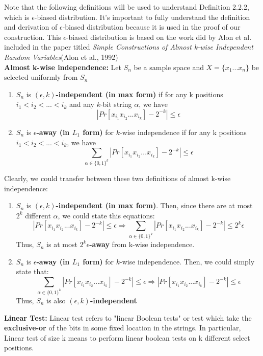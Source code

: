\documentclass[a4paper, english]{paper}
\begin{document}
Note that the following definitions will be used to understand Definition 2.2.2, which is $\epsilon$-biased distribution. It's important to fully understand the definition and derivation of $\epsilon$-biased distribution because it is used in the proof of our construction. This $\epsilon$-biased distribution is based on the work did by Alon et al. included in the paper titled \textit{Simple Constructions of Almost k-wise Independent Random Variables}(Alon et al., 1992)\\

	\noindent\textbf{Almost k-wise independence:}
	Let $S_n$ be a sample space and $X=\{x_1...x_n\}$ be selected uniformly from $S_n$
	\begin{enumerate}
	\item $S_n$ is  \textbf{$(\epsilon,k)$-independent (in max form)} if for any k positions $i_1<i_2<...<i_k$ and any $k$-bit string $\alpha$, we have
		$$|Pr[x_{i_1}x_{i_2}...x_{i_k}]-2^{-k}|\le \epsilon$$
	\item $S_n$ is \textbf{$\epsilon$-away (in $L_1$ form)} for $k$-wise independence if for any k positions $i_1<i_2<...<i_k$, we have
		$$\sum_{\alpha\in\{0,1\}^k}|Pr[x_{i_1}x_{i_2}...x_{i_k}]-2^{-k}| \le \epsilon$$
	\end{enumerate}\par
Clearly, we could transfer between these two definitions of almost k-wise independence:
	\begin{enumerate}
	\item $S_n$ is  \textbf{$(\epsilon,k)$-independent (in max form)}. Then, since there are at most $2^k$ different $\alpha$, we could state this equations:
$$|Pr[x_{i_1}x_{i_2}...x_{i_k}]-2^{-k}|\le \epsilon \Rightarrow \sum_{\alpha\in\{0,1\}^k}|Pr[x_{i_1}x_{i_2}...x_{i_k}]-2^{-k}| \le 2^k\epsilon$$
	Thus, $S_n$ is at most \textbf{$2^k\epsilon$-away} from k-wise independence.
	\item $S_n$ is \textbf{$\epsilon$-away (in $L_1$ form)} for $k$-wise independence. Then, we could simply state that:
$$\sum_{\alpha\in\{0,1\}^k}|Pr[x_{i_1}x_{i_2}...x_{i_k}]-2^{-k}| \le \epsilon \Rightarrow |Pr[x_{i_1}x_{i_2}...x_{i_k}]-2^{-k}|\le \epsilon $$
	Thus, $S_n$ is also \textbf{$(\epsilon,k)$-independent}
	\end{enumerate}
		
	\noindent\textbf{Linear Test:} Linear test refers to "linear Boolean tests" or test which take the \textbf{exclusive-or} of the bits in some fixed location in the strings. In particular, Linear test of size k means to perform linear boolean tests on k different select positions.\\
\end{document}
